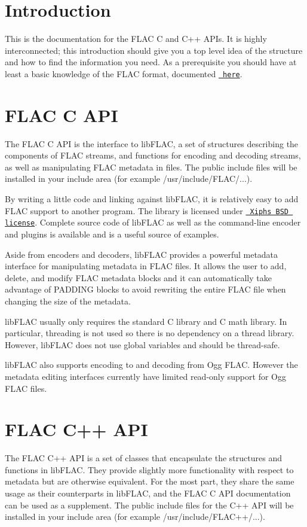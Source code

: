 \hypertarget{index_intro}{}\section{Introduction}\label{index_intro}
This is the documentation for the F\+L\+AC C and C++ A\+P\+Is. It is highly interconnected; this introduction should give you a top level idea of the structure and how to find the information you need. As a prerequisite you should have at least a basic knowledge of the F\+L\+AC format, documented \href{../format.html}{\texttt{ here}}.\hypertarget{index_c_api}{}\section{F\+L\+A\+C C A\+PI}\label{index_c_api}
The F\+L\+AC C A\+PI is the interface to lib\+F\+L\+AC, a set of structures describing the components of F\+L\+AC streams, and functions for encoding and decoding streams, as well as manipulating F\+L\+AC metadata in files. The public include files will be installed in your include area (for example /usr/include/\+F\+L\+A\+C/...).

By writing a little code and linking against lib\+F\+L\+AC, it is relatively easy to add F\+L\+AC support to another program. The library is licensed under \href{../license.html}{\texttt{ Xiph\textquotesingle{}s B\+SD license}}. Complete source code of lib\+F\+L\+AC as well as the command-\/line encoder and plugins is available and is a useful source of examples.

Aside from encoders and decoders, lib\+F\+L\+AC provides a powerful metadata interface for manipulating metadata in F\+L\+AC files. It allows the user to add, delete, and modify F\+L\+AC metadata blocks and it can automatically take advantage of P\+A\+D\+D\+I\+NG blocks to avoid rewriting the entire F\+L\+AC file when changing the size of the metadata.

lib\+F\+L\+AC usually only requires the standard C library and C math library. In particular, threading is not used so there is no dependency on a thread library. However, lib\+F\+L\+AC does not use global variables and should be thread-\/safe.

lib\+F\+L\+AC also supports encoding to and decoding from Ogg F\+L\+AC. However the metadata editing interfaces currently have limited read-\/only support for Ogg F\+L\+AC files.\hypertarget{index_cpp_api}{}\section{F\+L\+A\+C C++ A\+PI}\label{index_cpp_api}
The F\+L\+AC C++ A\+PI is a set of classes that encapsulate the structures and functions in lib\+F\+L\+AC. They provide slightly more functionality with respect to metadata but are otherwise equivalent. For the most part, they share the same usage as their counterparts in lib\+F\+L\+AC, and the F\+L\+AC C A\+PI documentation can be used as a supplement. The public include files for the C++ A\+PI will be installed in your include area (for example /usr/include/\+F\+L\+A\+C++/...).

